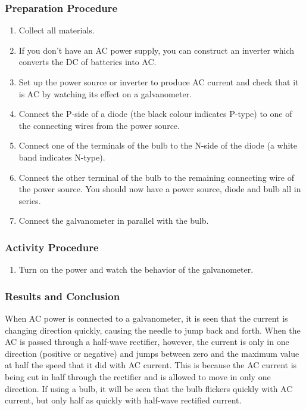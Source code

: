 \subsubsection*{Preparation Procedure}
\begin{enumerate}
\item{Collect all materials.}
\item{If you don't have an AC power supply, you can construct an inverter which converts the DC of batteries into AC.}
\item{Set up the power source or inverter to produce AC current and check that it is AC by watching its effect on a galvanometer.}
\item{Connect the P-side of a diode (the black colour indicates P-type) to one of the connecting wires from the power source.}
\item{Connect one of the terminals of the bulb to the N-side of the diode (a white band indicates N-type).}
\item{Connect the other terminal of the bulb to the remaining connecting wire of the power source.  You should now have a power source, diode and bulb all in series.}
\item{Connect the galvanometer in parallel with the bulb.}
\end{enumerate}

\subsubsection*{Activity Procedure}
\begin{enumerate}
\item{Turn on the power and watch the behavior of the galvanometer.}
\end{enumerate}

\subsubsection*{Results and Conclusion}
When AC power is connected to a galvanometer, it is seen that the current is changing direction quickly, causing the needle to jump back and forth.  When the AC is passed through a half-wave rectifier, however, the current is only in one direction (positive or negative) and jumps between zero and the maximum value at half the speed that it did with AC current.
This is because the AC current is being cut in half through the rectifier and is allowed to move in only one direction.  If using a bulb, it will be seen that the bulb flickers quickly with AC current, but only half as quickly with half-wave rectified current.

